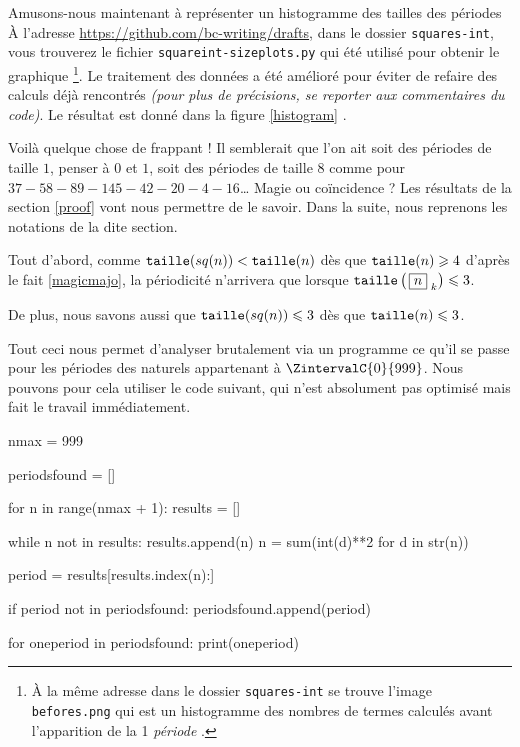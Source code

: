\medskip

Amusons-nous maintenant à représenter un histogramme des tailles des \og périodes \fg{}
À l'adresse \url{https://github.com/bc-writing/drafts}, dans le dossier \texttt{squares-int}, vous trouverez le fichier \texttt{squareint-sizeplots.py} qui été utilisé pour obtenir le graphique
\footnote{
	À la même adresse dans le dossier \texttt{squares-int} se trouve l'image \texttt{befores.png} qui est un histogramme des nombres de termes calculés avant l'apparition de la 1\iere{} \emph{\og période \fg{}}.
}.
Le traitement des données a été amélioré pour éviter de refaire des calculs déjà rencontrés \emph{(pour plus de précisions, se reporter aux commentaires du code)}.
Le résultat est donné dans la figure \ref{histogram} .



\medskip

Voilà quelque chose de frappant ! Il semblerait que l'on ait soit des périodes de taille $1$, penser à $0$ et $1$, soit des périodes de taille $8$ comme pour $37 - 58 - 89 - 145 - 42 - 20 - 4 - 16$\dots{}
Magie ou coïncidence ? Les résultats de la section \ref{proof} vont nous permettre de le savoir. Dans la suite, nous reprenons les notations de la dite section.


\medskip

Tout d'abord, comme $\operatorname{\text{\normalfont\texttt{taille}}}(sq(n)) < \operatorname{\text{\normalfont\texttt{taille}}}(n)$ dès que $\operatorname{\text{\normalfont\texttt{taille}}}(n) \geqslant 4$ d'après le fait \ref{magicmajo}, la périodicité n'arrivera que lorsque $\operatorname{\text{\normalfont\texttt{taille}}}\left( \, \fbox{$n$}_{\,\,k} \right) \leqslant 3$.


\medskip

De plus, nous savons aussi que $\operatorname{\text{\normalfont\texttt{taille}}}(sq(n)) \leqslant 3$ dès que $\operatorname{\text{\normalfont\texttt{taille}}}(n) \leqslant 3$.


\medskip

Tout ceci nous permet d'analyser brutalement via un programme ce qu'il se passe pour les périodes des naturels appartenant à $\ZintervalC{0}{999}$. Nous pouvons pour cela utiliser le code suivant, qui n'est absolument pas optimisé mais fait le travail immédiatement.

\begin{rawcode}
nmax = 999

periodsfound = []

for n in range(nmax + 1):
    results = []

    while n not in results:
        results.append(n)
        n = sum(int(d)**2 for d in str(n))

    period = results[results.index(n):]

    if period not in periodsfound:
        periodsfound.append(period)

for oneperiod in periodsfound:
    print(oneperiod)
\end{rawcode}



